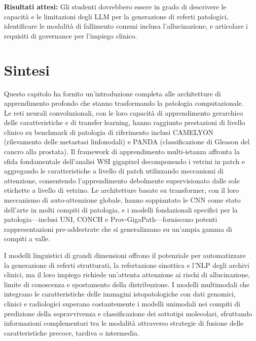 \textbf{Risultati attesi:} Gli studenti dovrebbero essere in grado di descrivere le capacità e le limitazioni degli LLM per la generazione di referti patologici, identificare le modalità di fallimento comuni inclusa l'allucinazione, e articolare i requisiti di governance per l'impiego clinico.

\section{Sintesi}
\label{sec:ch4_summary}

Questo capitolo ha fornito un'introduzione completa alle architetture di apprendimento profondo che stanno trasformando la patologia computazionale. Le reti neurali convoluzionali, con le loro capacità di apprendimento gerarchico delle caratteristiche e di transfer learning, hanno raggiunto prestazioni di livello clinico su benchmark di patologia di riferimento inclusi CAMELYON (rilevamento delle metastasi linfonodali) e PANDA (classificazione di Gleason del cancro alla prostata). Il framework di apprendimento multi-istanza affronta la sfida fondamentale dell'analisi WSI gigapixel decomponendo i vetrini in patch e aggregando le caratteristiche a livello di patch utilizzando meccanismi di attenzione, consentendo l'apprendimento debolmente supervisionato dalle sole etichette a livello di vetrino. Le architetture basate su transformer, con il loro meccanismo di auto-attenzione globale, hanno soppiantato le CNN come stato dell'arte in molti compiti di patologia, e i modelli fondazionali specifici per la patologia---inclusi UNI, CONCH e Prov-GigaPath---forniscono potenti rappresentazioni pre-addestrate che si generalizzano su un'ampia gamma di compiti a valle.

I modelli linguistici di grandi dimensioni offrono il potenziale per automatizzare la generazione di referti strutturati, la refertazione sinottica e l'NLP degli archivi clinici, ma il loro impiego richiede un'attenta attenzione ai rischi di allucinazione, limite di conoscenza e spostamento della distribuzione. I modelli multimodali che integrano le caratteristiche delle immagini istopatologiche con dati genomici, clinici e radiologici superano costantemente i modelli unimodali nei compiti di predizione della sopravvivenza e classificazione dei sottotipi molecolari, sfruttando informazioni complementari tra le modalità attraverso strategie di fusione delle caratteristiche precoce, tardiva o intermedia.

